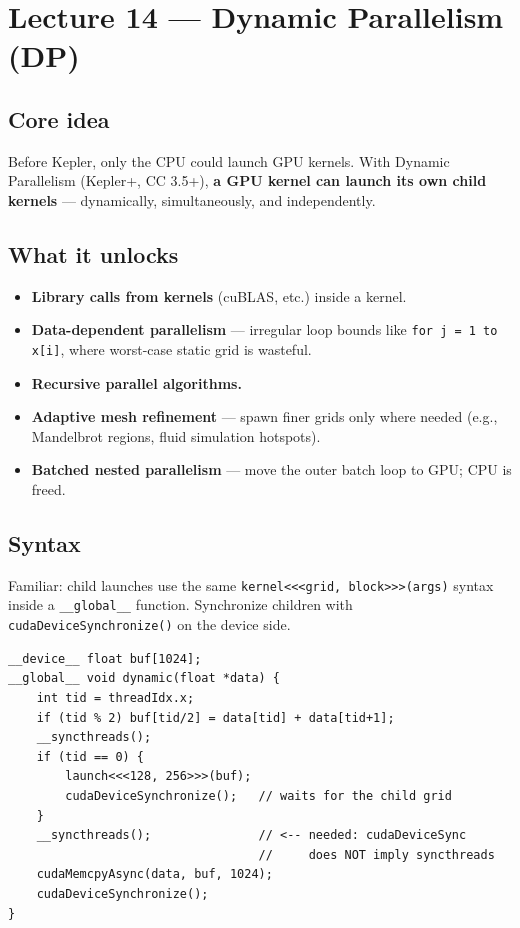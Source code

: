 \documentclass[10pt]{article}
\begin{document}
\section{Lecture 14 — Dynamic Parallelism (DP)}

\subsection*{Core idea}
Before Kepler, only the CPU could launch GPU kernels. With Dynamic Parallelism (Kepler+, CC 3.5+), \textbf{a GPU kernel can launch its own child kernels} — dynamically, simultaneously, and independently.

\subsection*{What it unlocks}
\begin{itemize}
  \item \textbf{Library calls from kernels} (cuBLAS, etc.) inside a kernel.
  \item \textbf{Data-dependent parallelism} — irregular loop bounds like \texttt{for j = 1 to x[i]}, where worst-case static grid is wasteful.
  \item \textbf{Recursive parallel algorithms.}
  \item \textbf{Adaptive mesh refinement} — spawn finer grids only where needed (e.g., Mandelbrot regions, fluid simulation hotspots).
  \item \textbf{Batched nested parallelism} — move the outer batch loop to GPU; CPU is freed.
\end{itemize}

\subsection*{Syntax}
Familiar: child launches use the same \texttt{kernel<<<grid, block>>>(args)} syntax inside a \texttt{\_\_global\_\_} function. Synchronize children with \texttt{cudaDeviceSynchronize()} on the device side.

\begin{lstlisting}
__device__ float buf[1024];
__global__ void dynamic(float *data) {
    int tid = threadIdx.x;
    if (tid % 2) buf[tid/2] = data[tid] + data[tid+1];
    __syncthreads();
    if (tid == 0) {
        launch<<<128, 256>>>(buf);
        cudaDeviceSynchronize();   // waits for the child grid
    }
    __syncthreads();               // <-- needed: cudaDeviceSync
                                   //     does NOT imply syncthreads
    cudaMemcpyAsync(data, buf, 1024);
    cudaDeviceSynchronize();
}
\end{lstlisting}
\end{document}
